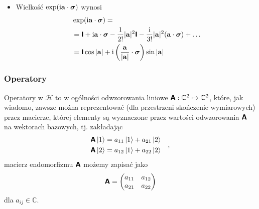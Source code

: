 \documentclass{myclass}
\begin{document}
\begin{itemize}
    \item Wielkość \(\exp(\mathrm{i}\mathbf{a}\cdot\boldsymbol{\sigma})\) wynosi
    \begin{equation*}
        \begin{split}
            &\exp(\mathrm{i}\mathbf{a}\cdot\boldsymbol{\sigma}) =\\
            &= \boldsymbol{\mathsf{I}}+\mathrm{i}\mathbf{a}\cdot\boldsymbol{\sigma} - \frac{1}{2!}|\mathbf{a}|^2\boldsymbol{\mathsf{I}} - \frac{\mathrm{i}}{3!}|\mathbf{a}|^2(\mathbf{a}\cdot\boldsymbol{\sigma}) + \ldots \\
            &= \boldsymbol{\mathsf{I}} \cos{|\mathbf{a}|} + \mathrm{i}\left(\frac{\mathbf{a}}{|\mathbf{a}|}\cdot\boldsymbol{\sigma}\right)\sin{|\mathbf{a}|}
        \end{split}
    \end{equation*}

\end{itemize}

\subsubsection{Operatory}

Operatory w \(\mathscr{H}\) to w ogólności odwzorowania liniowe
\(\boldsymbol{\mathsf{A}}:\mathbb{C}^2\mapsto\mathbb{C}^2\), które, jak wiadomo, zawsze można reprezentować (dla
przestrzeni skończenie wymiarowych) przez macierze, której elementy są wyznaczone przez wartości
odwzorowania \(\boldsymbol{\mathsf{A}}\) na wektorach bazowych, tj. zakładając
\begin{equation*}
    \begin{split}
        \boldsymbol{\mathsf{A}}\ket{1} = a_{11}\ket{1} + a_{21}\ket{2}\\
        \boldsymbol{\mathsf{A}}\ket{2} = a_{12}\ket{1} + a_{22}\ket{2}
    \end{split}\quad,
\end{equation*}
macierz endomorfizmu \(\boldsymbol{\mathsf{A}}\) możemy zapisać jako
\begin{equation*}
    \oper{A} = \mqty(a_{11} & a_{12} \\ a_{21} & a_{22})
\end{equation*}
dla \(a_{ij} \in \mathbb{C}\).
\end{document}
